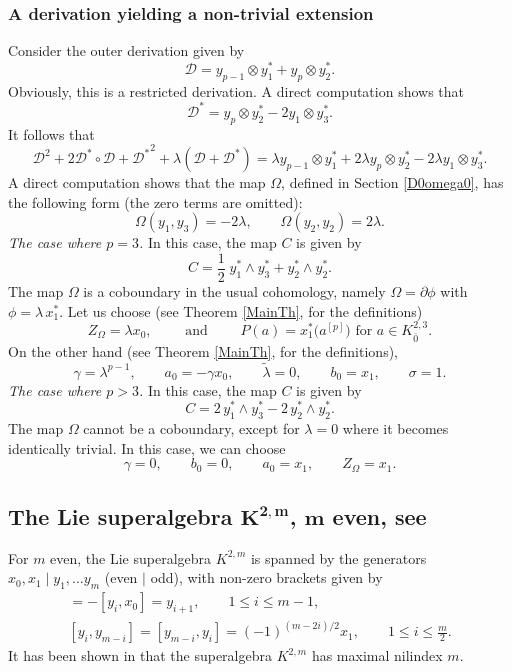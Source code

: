 \documentclass[pdftex]{sigma}
\numberwithin{equation}{section}
\begin{document}
\subsubsection{A derivation yielding a non-trivial extension} Consider the outer derivation given by
\[
{\mathscr D}=y_{p-1}\otimes y_1^*+y_p \otimes y_2^*.
\]
Obviously, this is a restricted derivation. A direct computation shows that
\[
{\mathscr D}^*= y_p \otimes y_2^* -2 y_1 \otimes y_3^*.
\]
It follows that
\[
{\mathscr D}^2+2 {\mathscr D}^*\circ {\mathscr D}+{{\mathscr D}^*}^2+\lambda({\mathscr D}+{\mathscr D}^*)=
\lambda y_{p-1}\otimes y_1^*+2\lambda y_p \otimes y^*_2-2\lambda y_1\otimes y^*_3.
\]
A direct computation shows that the map $\Omega$, defined in Section \ref{D0omega0}, has the following form (the zero terms are omitted):
\[
\Omega(y_1,y_3)=-2\lambda, \qquad \Omega(y_2,y_2)=2\lambda .
\]
\textit{The case where $p=3$.} In this case, the map $C$ is given by
\[
C=\frac{1}{2} \; y_1^*\wedge y_3^* +y_2^*\wedge y_2^*.
\]
The map $\Omega$ is a coboundary in the usual cohomology, namely $\Omega= \partial \phi$ with $\phi=\lambda \, x_1^*$. Let us choose (see Theorem \ref{MainTh}, for the definitions)
\[
Z_\Omega=\lambda x_0,\qquad \text{ and } \qquad P(a)=x^*_1\bigl(a^{[p]}\bigr) \text{ for $a \in K^{2,3}_{\bar 0}$}.
\]
On the other hand (see Theorem \ref{MainTh}, for the definitions),
\[
\gamma=\lambda^{p-1},\qquad a_0=- \gamma x_0, \qquad \tilde \lambda=0, \qquad b_0=x_1,\qquad \sigma=1.
\]
\textit{The case where $p>3$.} In this case, the map $C$ is given by
\[
C=2 \, y_1^*\wedge y_{3}^* - 2 \,y_2^*\wedge y_2^*.
\]
The map $\Omega$ cannot be a coboundary, except for $\lambda=0$ where it becomes identically trivial. In this case, we can choose
\[
\gamma=0, \qquad b_0=0, \qquad a_0= x_1,\qquad Z_\Omega= x_1.
\]

\subsection[The Lie superalgebra K\^{}\{2,m\}, m even, see \protect{[28]}]{The Lie superalgebra $\boldsymbol{K^{2,m}}$, $\boldsymbol{m}$ even, see \cite{GKN}}

For $m$ even, the Lie superalgebra $K^{2,m}$ is spanned by the generators $x_0, x_1\mid y_1,\ldots y_m$ (even $|$ odd), with non-zero brackets given by
\begin{gather*}
[x_0, y_i] = -[y_i, x_0] = y_{i+1},\qquad 1\leq i\leq m-1, \\
[y_i, y_{m-i}] = [ y_{m-i}, y_i] = (-1)^{(m-2i)/2}x_1, \qquad 1 \leq i\leq \frac{m}{2}.
\end{gather*}
It has been shown in \cite{GKN} that the superalgebra $K^{2,m}$ has maximal nilindex $m$.
\end{document}
